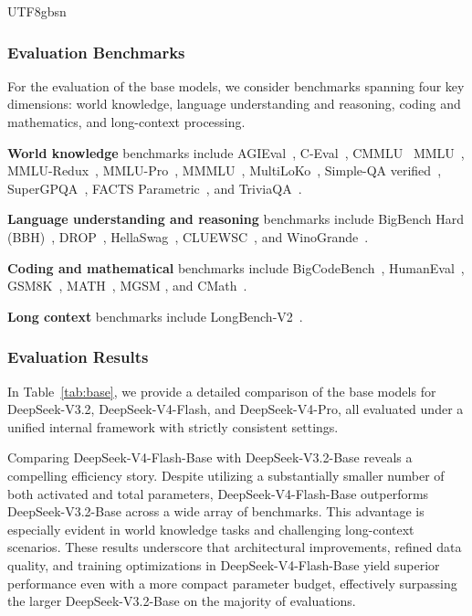 \documentclass[11pt, a4paper, logo, copyright, nonumbering]{deepseek}
\newcommand{\dsviiiII}{DeepSeek-V3.2}
\newcommand{\dsvivp}{DeepSeek-V4-Pro}
\newcommand{\dsvivf}{DeepSeek-V4-Flash}
\begin{document}
\begin{CJK*}{UTF8}{gbsn}
\subsubsection{Evaluation Benchmarks}

For the evaluation of the base models, we consider benchmarks spanning four key dimensions: world knowledge, language understanding and reasoning, coding and mathematics, and long-context processing.

\textbf{World knowledge} benchmarks include 
AGIEval~\citep{agieval}, C-Eval~\citep{ceval}, CMMLU~\citep{cmmlu}
MMLU~\citep{mmlu}, MMLU-Redux~\citep{mmlu_redux}, MMLU-Pro~\citep{mmlu_pro}, MMMLU~\citep{mmmlu}, MultiLoKo~\citep{multiloko},
Simple-QA verified~\citep{haas2025simpleqa}, SuperGPQA~\citep{du2025supergpqa}, FACTS Parametric~\citep{cheng2025facts},
and TriviaQA~\citep{joshi-etal-2017-triviaqa}.

\textbf{Language understanding and reasoning} benchmarks include 
BigBench Hard (BBH)~\citep{bbh}, DROP~\citep{drop}, 
HellaSwag~\citep{hellaswag}, CLUEWSC~\citep{clue}, and WinoGrande~\citep{sakaguchi2019winogrande}.

\textbf{Coding and mathematical} benchmarks include
BigCodeBench~\citep{big_code_bench}, HumanEval~\citep{codex}, GSM8K~\citep{gsm8k}, MATH~\citep{hendrycks2021measuring}, MGSM \citep{mgsm}, and CMath~\citep{wei2023cmath}.

\textbf{Long context} benchmarks include LongBench-V2~\citep{bai2025longbench}. 



\subsubsection{Evaluation Results}

In Table~\ref{tab:base}, we provide a detailed comparison of the base models for \dsviiiII{}, \dsvivf{}, and \dsvivp{}, all evaluated under a unified internal framework with strictly consistent settings.

Comparing \dsvivf{}-Base with \dsviiiII{}-Base reveals a compelling efficiency story. 
Despite utilizing a substantially smaller number of both activated and total parameters, \dsvivf{}-Base outperforms \dsviiiII{}-Base across a wide array of benchmarks. 
This advantage is especially evident in world knowledge tasks and challenging long-context scenarios. 
These results underscore that architectural improvements, refined data quality, and training optimizations in \dsvivf{}-Base yield superior performance even with a more compact parameter budget, effectively surpassing the larger \dsviiiII{}-Base on the majority of evaluations.


\end{CJK*}
\end{document}
